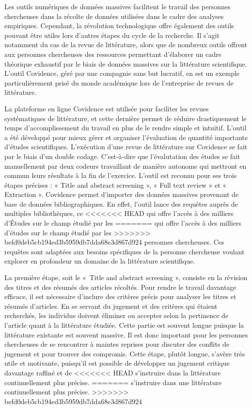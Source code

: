 \documentclass[
  letterpaper,
]{scrbook}
\begin{document}
Les outils numériques de données massives facilitent le travail des
personnes chercheuses dans la récolte de données utilisées dans le cadre
des analyses empiriques. Cependant, la révolution technologique offre
également des outils pouvant être utiles lors d'autres étapes du cycle
de la recherche. Il s'agit notamment du cas de la revue de littérature,
alors que de nombreux outils offrent aux personnes chercheuses des
ressources permettant d'élaborer un cadre théorique exhaustif par le
biais de données massives sur la littérature scientifique. L'outil
Covidence, géré par une compagnie sans but lucratif, en est un exemple
particulièrement prisé du monde académique lors de l'entreprise de
revues de littérature.

La plateforme en ligne Covidence est utilisée pour faciliter les revues
systématiques de littérature, et cette dernière permet de réduire
drastiquement le temps d'accomplissement du travail en plus de le rendre
simple et intuitif. L'outil a été développé pour mieux gérer et
organiser l'évaluation de quantité importante d'études scientifiques.
L'exécution d'une revue de littérature sur Covidence se fait par le
biais d'un double codage. C'est-à-dire que l'évalutation des études se
fait manuellement par deux codeurs travaillant de manière autonome qui
mettront en commun leurs résultats à la fin de l'exercice. L'outil est
reconnu pour ses trois étapes précises : « Title and abstract screening
», « Full text review » et « Extraction ». Covidence permet d'importer
des données massives provenant de base de données bibliographiques. En
effet, l'outil lance des requêtes auprès de multiples bibliothèques, ce
<<<<<<< HEAD
qui offre l'accès à des milliers d'Études sur le champ étudié par les
=======
qui offre l'accès à des milliers d'études sur le champ étudié par les
>>>>>>> befd0deb5cb194ed3b5959db7dda68e3d867d924
personnes chercheuses. Ces requêtes sont adaptées aux besoins
spécifiques de la personne chercheuse voulant explorer en profondeur un
domaine de la littérature scientifique.

La première étape, soit le «~Title and abstract screening », consiste en
la révision des titres et des résumés des articles récoltés. Pour rendre
le travail davantage efficace, il est nécessaire d'inclure des critères
précis pour analyser les titres et résumés d'articles. En se servant du
jugement et des critères qui étaient recherchés, les individus doivent
éliminer ou accepter selon la pertinence de l'article quant à la
littérature étudiée. Cette partie est souvent longue puisque la
littérature existante est souvent massive. Il est donc important pour
les personnes chercheuses de se rencontrer à maintes reprises pour
discuter des conflits de jugement et pour trouver des compromis. Cette
étape, plutôt longue, s'avère très utile et motivante, puisqu'il est
possible de développer un jugement critique davantage raffiné et de
<<<<<<< HEAD
s'instruire dans la littérature continuellement plus précise.
=======
s'instruire dans une littérature continuellement plus précise.
>>>>>>> befd0deb5cb194ed3b5959db7dda68e3d867d924
\end{document}
